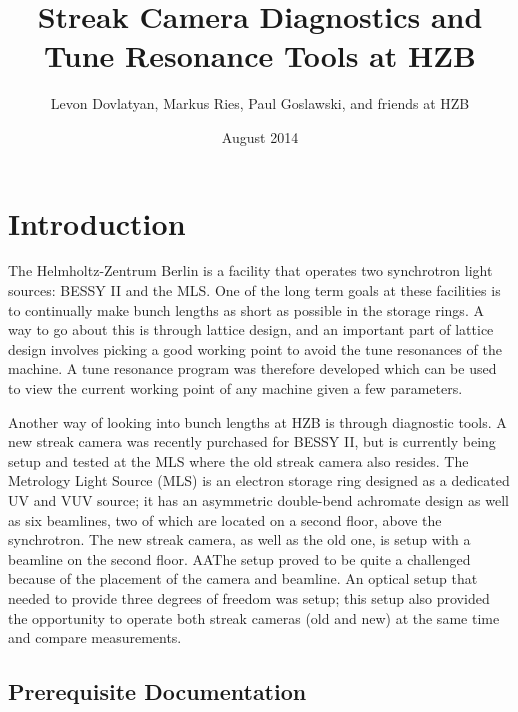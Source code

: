 \documentclass[%
 reprint,%
 amssymb, amsmath,%
 aip,cha,%
]{revtex4-1}
\begin{document}
\title{Streak Camera Diagnostics and Tune Resonance Tools at HZB}%

\author{Levon Dovlatyan, Markus Ries, Paul Goslawski, and friends at HZB}%
%

\date{August 2014}%

\maketitle

\tableofcontents

\section{Introduction}

The Helmholtz-Zentrum Berlin is a facility that operates two synchrotron light sources: BESSY II and the MLS. One of the long term goals at these facilities is to continually make bunch lengths as short as possible in the storage rings. A way to go about this is through lattice design, and an important part of lattice design involves picking a good working point to avoid the tune resonances of the machine. A tune resonance program was therefore developed which can be used to view the current working point of any machine given a few parameters.

Another way of looking into bunch lengths at HZB is through diagnostic tools. A new streak camera was recently purchased for BESSY II, but is currently being setup and tested at the MLS where the old streak camera also resides. The Metrology Light Source (MLS) is an electron storage ring designed as a dedicated UV and VUV source; it has an asymmetric double-bend achromate design as well as six beamlines, two of which are located on a second floor, above the synchrotron. The new streak camera, as well as the old one, is setup with a beamline on the second floor. AAThe setup proved to be quite a challenged because of the placement of the camera and beamline. An optical setup that needed to provide three degrees of freedom was setup; this setup also provided the opportunity to operate both streak cameras (old and new) at the same time and compare measurements.


\subsection{Prerequisite Documentation}
\end{document}
